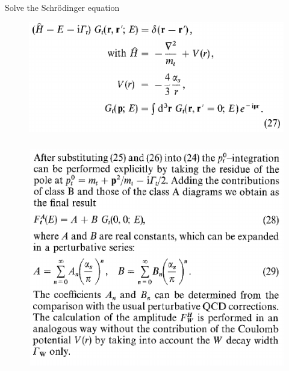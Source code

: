\documentclass[8pt,dvipsnames,table]{beamer}
\begin{document}
\begin{frame}
	\frametitle{\citet{Melnikov:1994jb}}

	Solve the Schr\"odinger equation
	\begin{figure}[!htb]
		\centering
		\includegraphics[width=0.8\linewidth]{image8.png}
		\label{fig:image8}
	\end{figure}

\end{frame}

\begin{frame}
	\frametitle{\citet{Melnikov:1994jb}}


	\begin{figure}[!htb]
		\centering
		\includegraphics[width=.8\linewidth]{image15.png}
		\label{fig:image15}
	\end{figure}


\end{frame}
\end{document}
